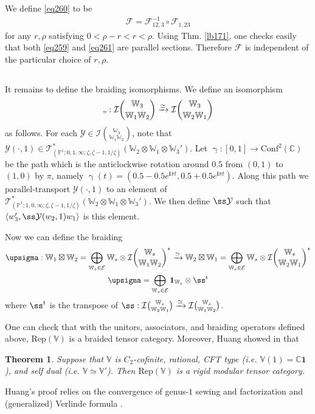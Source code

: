 \documentclass[11pt,b5paper,notitlepage]{article}
\theoremstyle{definition}
\theoremstyle{plain}
\newtheorem{thm}[df]{Theorem}
\newcommand{\mc}{\mathcal}
\newcommand{\tr}{\mathrm{t}} %
\newcommand{\id}{\mathbf{1}}
\newcommand{\Conf}{\mathrm{Conf}}
\newcommand{\Rep}{\mathrm{Rep}}
\newcommand{\bk}[1]{\langle {#1}\rangle}
\newcommand{\scr}{\mathscr}
\newcommand{\im}{\mathbf{i}}
\newcommand{\Vbb}{\mathbb V}
\newcommand{\Wbb}{\mathbb W}
\newcommand{\Cbb}{\mathbb C}
\newcommand{\Pbb}{\mathbb P}
\numberwithin{equation}{section}
\begin{document}
We define \eqref{eq260} to be
\begin{align}
\mc F=\mc F_{12,3}^{-1}\circ\mc F_{1,23}
\end{align}
for any $r,\rho$ satisfying $0<\rho-r<r<\rho$. Using Thm. \ref{lb171}, one checks easily that both \eqref{eq259} and \eqref{eq261} are parallel sections. Therefore $\mc F$ is independent of the particular choice of $r,\rho$. 

\subsection{}\label{lb187}

It remains to define the braiding isomorphisms. We define an isomorphism
\begin{align}
\ss:\mc I{\Wbb_3\choose \Wbb_1\Wbb_2}\xrightarrow{\simeq}\mc I{\Wbb_3\choose \Wbb_2\Wbb_1}
\end{align}
as follows. For each $\mc Y\in\mc I{\Wbb_3\choose \Wbb_1\Wbb_2}$, note that $\mc Y(\cdot,1)\in\scr T_{(\Pbb^1;0,1,\infty;\zeta,\zeta-1,1/\zeta)}^*(\Wbb_2\otimes\Wbb_1\otimes\Wbb_3')$. Let  $\upgamma:[0,1]\rightarrow\Conf^2(\Cbb)$ be the path which is the anticlockwise rotation around $0.5$ from $(0,1)$ to $(1,0)$ by $\pi$, namely $\upgamma(t)=(0.5-0.5e^{\im\pi t},0.5+0.5e^{\im\pi t})$. Along this path we parallel-transport $\mc Y(\cdot,1)$ to an element of $\scr T_{(\Pbb^1;1,0,\infty;\zeta,\zeta-1,1/\zeta)}^*(\Wbb_2\otimes\Wbb_1\otimes\Wbb_3')$. We then define $\ss\mc Y$ such that $\bk{w_3',\ss\mc Y(w_2,1)w_1}$ is this element.

Now we can define the braiding 
\begin{gather}
\begin{gathered}
\upsigma:\Wbb_1\boxtimes\Wbb_2=\bigoplus_{\Wbb_s\in\mc E}\Wbb_s\otimes\mc I{\Wbb_s\choose \Wbb_1\Wbb_2}^*\xrightarrow{\simeq}\Wbb_2\boxtimes\Wbb_1=\bigoplus_{\Wbb_s\in\mc E}\Wbb_s\otimes\mc I{\Wbb_s\choose \Wbb_2\Wbb_1}^*\\
\upsigma=\bigoplus_{\Wbb_s\in\mc E}\id_{\Wbb_s}\otimes \ss^\tr
\end{gathered}
\end{gather}
where $\ss^\tr$ is the transpose of $\ss:\mc I{\Wbb_s\choose \Wbb_2\Wbb_1}\xrightarrow{\simeq}\mc I{\Wbb_s\choose \Wbb_1\Wbb_2}$.

One can check that with the unitors, associators, and braiding operators defined above, $\Rep(\Vbb)$ is a braided tensor category. Moreover, Huang showed in \cite{Hua08b} that
\begin{thm}
Suppose that $\Vbb$ is $C_2$-cofinite, rational, CFT type (i.e. $\Vbb(1)=\Cbb\id$), and self dual (i.e. $\Vbb\simeq\Vbb'$). Then $\Rep(\Vbb)$ is a rigid modular tensor category.
\end{thm}
Huang's proof relies on the convergence of genus-$1$ sewing and factorization \cite{Zhu96,Hua05} and (generalized) Verlinde formula \cite{Hua08a}. 
\end{document}

